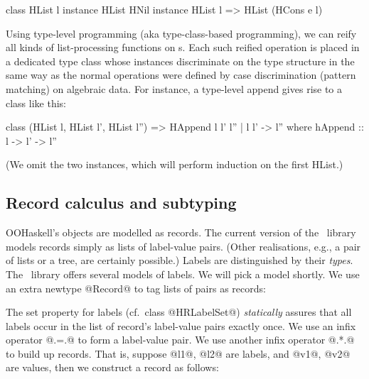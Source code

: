 \begin{code}
 class HList l
 instance HList HNil
 instance HList l => HList (HCons e l)
\end{code}

\noindent
Using type-level programming (aka type-class-based programming), we can
reify all kinds of list-processing functions on \HList{}s. Each such
reified operation is placed in a dedicated type class whose instances
discriminate on the type structure in the same way as the normal
operations were defined by case discrimination (pattern matching) on
algebraic data. For instance, a type-level append gives rise to a
class like this:

\begin{code}
 class (HList l, HList l', HList l'')
    =>  HAppend l l' l'' | l l' -> l''
  where hAppend :: l -> l' -> l''
\end{code}

\noindent
(We omit the two instances, which will perform induction on the first HList.)





\subsection{Record calculus and subtyping}

OOHaskell's objects are modelled as records. The current version of
the \HList\ library models records simply as lists of label-value
pairs. (Other realisations, e.g., a pair of lists or a tree, are
certainly possible.) Labels are distinguished by their
\emph{types}. The \HList\ library offers several models of labels. We
will pick a model shortly. We use an extra newtype @Record@ to tag
lists of pairs as records:


\noindent
The set property for labels (cf.\ class @HRLabelSet@) \emph{statically}
assures that all labels occur in the list of record's label-value
pairs exactly once.
We use an infix operator @.=.@ to form a label-value pair.  We use
another infix operator @.*.@ to build up records. That is, suppose
@l1@, @l2@ are labels, and @v1@, @v2@ are values, then we construct a
record as follows:

